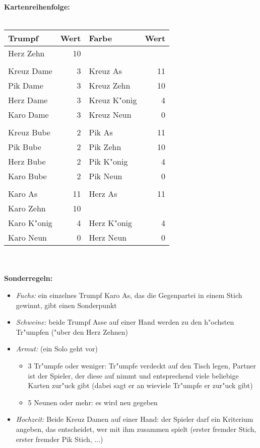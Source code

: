 \documentclass[a4paper,11pt,twocolumn]{article}
\begin{document}
\thispagestyle{empty}
\textbf{Kartenreihenfolge:}\ \\
\smallskip\ \\
\begin{tabular}{lr|lr}
Trumpf & Wert & Farbe & Wert\\
\hline
Herz Zehn & 10 &  &      \\
          &    &  &      \\
Kreuz Dame & 3 &  Kreuz As & 11\\
Pik Dame & 3   &  Kreuz Zehn & 10\\
Herz Dame & 3  &  Kreuz K"onig & 4\\
Karo Dame & 3  &Kreuz Neun  & 0\\
          &    &           & \\
Kreuz Bube& 2  &   Pik As & 11\\
Pik Bube  & 2  &  Pik Zehn & 10\\
Herz Bube & 2  &  Pik K"onig & 4\\
Karo Bube & 2  &  Pik Neun   & 0\\
          &    &            & \\
Karo As   & 11 & Herz As    & 11\\
Karo Zehn & 10 &            & \\
Karo K"onig & 4 & Herz K"onig& 4\\
Karo Neun   & 0 & Herz Neun  &0\\
\end{tabular}
\ \\
\smallskip
\ \\
\textbf{Sonderregeln:}
\begin{itemize}
\item \textit{Fuchs:} ein einzelnes Trumpf Karo As, das die Gegenpartei in einem Stich gewinnt, gibt einen Sonderpunkt
\item \textit{Schweine:} beide Trumpf Asse auf einer Hand werden zu den h"ochsten Tr"umpfen ("uber den Herz Zehnen)
\item \textit{Armut:} (ein Solo geht vor)
\begin{itemize}
\item 3 Tr"umpfe oder weniger: Tr"umpfe verdeckt auf den Tisch legen, Partner ist der Spieler, der diese auf nimmt und entsprechend viele
beliebige Karten zur"uck gibt (dabei sagt er an wieviele Tr"umpfe er zur"uck gibt)
\item 5 Neunen oder mehr: es wird neu gegeben
\end{itemize}
\item \textit{Hochzeit:} Beide Kreuz Damen auf einer Hand: der Spieler darf ein Kriterium angeben, das entscheidet, wer mit ihm zusammen spielt
(erster fremder Stich, erster fremder Pik Stich, ...)
\end{itemize}
\end{document}
